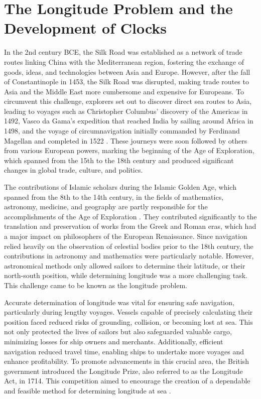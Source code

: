 \section{The Longitude Problem and the Development of Clocks}

In the 2nd century BCE, the Silk Road was established as a network of trade routes linking China with the Mediterranean region, fostering the exchange of goods, ideas, and technologies between Asia and Europe. However, after the fall of Constantinople in 1453, the Silk Road was disrupted, making trade routes to Asia and the Middle East more cumbersome and expensive for Europeans. To circumvent this challenge, explorers set out to discover direct sea routes to Asia, leading to voyages such as Christopher Columbus' discovery of the Americas in 1492, Vasco da Gama's expedition that reached India by sailing around Africa in 1498, and the voyage of circumnavigation initially commanded by Ferdinand Magellan and completed in 1522 \citep{Parry1992}. These journeys were soon followed by others from various European powers, marking the beginning of the Age of Exploration, which spanned from the 15th to the 18th century and produced significant changes in global trade, culture, and politics.

The contributions of Islamic scholars during the Islamic Golden Age, which spanned from the 8th to the 14th century, in the fields of mathematics, astronomy, medicine, and geography are partly responsible for the accomplishments of the Age of Exploration \citep{Hodgson1977}. They contributed significantly to the translation and preservation of works from the Greek and Roman eras, which had a major impact on philosophers of the European Renaissance. Since navigation relied heavily on the observation of celestial bodies prior to the 18th century, the contributions in astronomy and mathematics were particularly notable. However, astronomical methods only allowed sailors to determine their latitude, or their north-south position, while determining longitude was a more challenging task. This challenge came to be known as the longitude problem.

Accurate determination of longitude was vital for ensuring safe navigation, particularly during lengthy voyages. Vessels capable of precisely calculating their position faced reduced risks of grounding, collision, or becoming lost at sea. This not only protected the lives of sailors but also safeguarded valuable cargo, minimizing losses for ship owners and merchants. Additionally, efficient navigation reduced travel time, enabling ships to undertake more voyages and enhance profitability. To promote advancements in this crucial area, the British government introduced the Longitude Prize, also referred to as the Longitude Act, in 1714. This competition aimed to encourage the creation of a dependable and feasible method for determining longitude at sea \citep{Sobel2007}.

